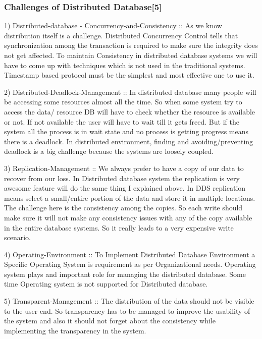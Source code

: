\documentclass{article}[12pt,a4paper]
\begin{document}
\subsubsection {Challenges of Distributed Database[5]}

1) Distributed-database - Concurrency-and-Consistency :: As we know distribution itself is a challenge. Distributed Concurrency Control tells that synchronization among the transaction is required to make sure the integrity does not get affected. To maintain Consistency in distributed database systems we will have to come up with techniques which is not used in the traditional systems. Timestamp based protocol must be the simplest and most effective one to use it.

2) Distributed-Deadlock-Management :: In distributed database many people will be accessing some resources almost all the time. So when some system try to access the data/ resource DB will have to check whether the resource is available or not. If not available the user will have to wait till it gets freed. But if the system all the process is in wait state and no process is getting progress means there is a deadlock. In distributed environment, finding and avoiding/preventing deadlock is a big challenge because the systems are loosely coupled.

3) Replication-Management :: We always prefer to have a copy of our data to recover from our loss. In Distributed database system the replication is very awesome feature will do the same thing I explained above. In DDS replication means select a small/entire portion of the data and store it in multiple locations. The challenge here is the consistency among the copies. So each write should make sure it will not make any consistency issues with any of the copy available in the entire database systems. So it really leads to a very expensive write scenario.

4) Operating-Environment :: To Implement Distributed Database Environment a Specific Operating System is requirement as per Organizational needs. Operating system plays and important role for managing the distributed database. Some time Operating system is not supported for Distributed database.

5) Transparent-Management :: The distribution of the data should not be visible to the user end. So transparency has to be managed to improve the usability of the system and also it should not forget about the consistency while implementing the transparency in the system.
\end{document}
